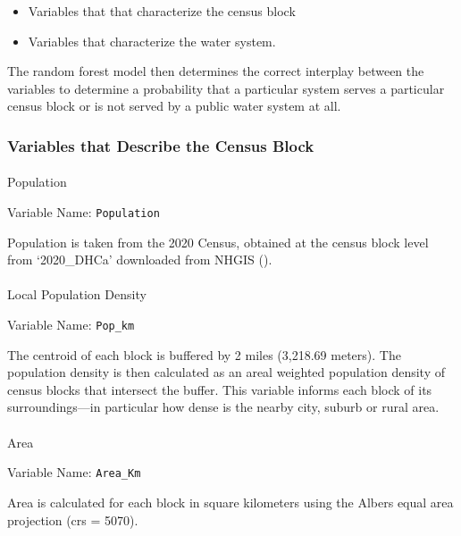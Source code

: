 \documentclass[12pt]{article}
\makeatletter
\providecommand{\tightlist}{%
  \setlength{\itemsep}{0pt}\setlength{\parskip}{0pt}}
\let\oldparagraph\paragraph
\renewcommand{\paragraph}{
    \@ifstar
      \xxxParagraphStar
      \xxxParagraphNoStar
  }
\newcommand{\xxxParagraphStar}[1]{\oldparagraph*{#1}\mbox{}}
\newcommand{\xxxParagraphNoStar}[1]{\oldparagraph{#1}\mbox{}}
\makeatother
\begin{document}
\begin{itemize}
\tightlist
\item
  Variables that that characterize the census block
\item
  Variables that characterize the water system.
\end{itemize}

The random forest model then determines the correct interplay between
the variables to determine a probability that a particular system serves
a particular census block or is not served by a public water system at
all.

\subsubsection{Variables that Describe the Census
Block}\label{variables-that-describe-the-census-block}

\paragraph{Population}\label{population}

Variable Name: \texttt{Population}

Population is taken from the 2020 Census, obtained at the census block
level from `2020\_DHCa' downloaded from NHGIS
().

\paragraph{Local Population Density}\label{local-population-density}

Variable Name: \texttt{Pop\_km}

The centroid of each block is buffered by 2 miles (3,218.69 meters). The
population density is then calculated as an areal weighted population
density of census blocks that intersect the buffer. This variable
informs each block of its surroundings---in particular how dense is the
nearby city, suburb or rural area.

\paragraph{Area}\label{area}

Variable Name: \texttt{Area\_Km}

Area is calculated for each block in square kilometers using the Albers
equal area projection (crs = 5070).
\end{document}
